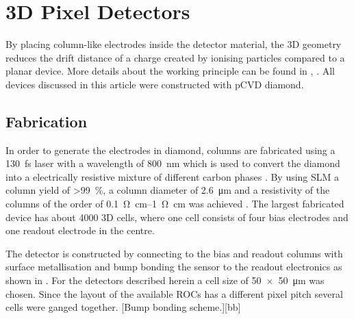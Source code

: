 \section{3D Pixel Detectors}
By placing column-like electrodes inside the detector material, the 3D geometry reduces the drift distance of a charge created by ionising particles compared to a planar device. More details about the working principle can be found in \cite{parker}, \cite{3D}. All devices discussed in this article were constructed with \ac{pCVD} diamond.
\subsection{Fabrication}
In order to generate the electrodes in diamond, columns are 
fabricated using a \SI{130}{\femto\second} laser with a wavelength of \SI{800}{\nano\meter} which is used to convert the diamond into a electrically resistive mixture of different carbon phases \cite{3dfab}. By using \ac{SLM} a column yield of \SI{>99}{\%}, a column diameter of \SI{2.6}{\micro\meter} and a resistivity of the columns of the order of \SIrange{.1}{1}{\ohm\centi\meter} was achieved \cite{slm}. The largest fabricated device has about 4000 3D cells, where one cell consists of four bias electrodes and one readout electrode in the centre. \par
The detector is constructed by connecting to the bias and readout columns with surface metallisation and bump bonding the sensor to the readout electronics as shown in . For the detectors described herein a cell size of \SI{50x50}{\micro\meter} was chosen. Since the layout of the available \acp{ROC} has a different pixel pitch several cells were ganged together.
[Bump bonding scheme.][bb]
